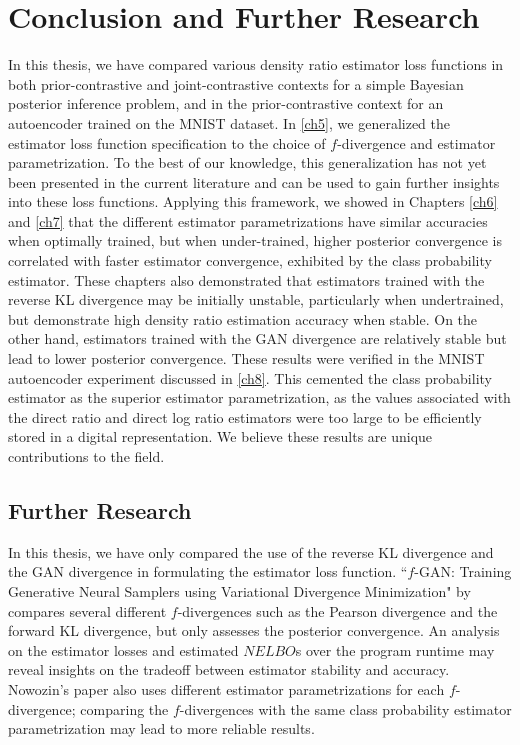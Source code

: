 \documentclass[honours,12pt, twoside]{unswthesis}
\numberwithin{equation}{section}
\theoremstyle{definition}
\begin{document}
\chapter{Conclusion and Further Research}\label{ch9}
In this thesis, we have compared various density ratio estimator loss functions in both prior-contrastive and joint-contrastive contexts for a simple Bayesian posterior inference problem, and in the prior-contrastive context for an autoencoder trained on the MNIST dataset. In \autoref{ch5}, we generalized the estimator loss function specification to the choice of $f$-divergence and estimator parametrization. To the best of our knowledge, this generalization has not yet been presented in the current literature and can be used to gain further insights into these loss functions. Applying this framework, we showed in Chapters \ref{ch6} and \ref{ch7} that the different estimator parametrizations have similar accuracies when optimally trained, but when under-trained, higher posterior convergence is correlated with faster estimator convergence, exhibited by the class probability estimator. These chapters also demonstrated that estimators trained with the reverse KL divergence may be initially unstable, particularly when undertrained, but demonstrate high density ratio estimation accuracy when stable. On the other hand, estimators trained with the GAN divergence are relatively stable but lead to lower posterior convergence. These results were verified in the MNIST autoencoder experiment discussed in \autoref{ch8}. This cemented the class probability estimator as the superior estimator parametrization, as the values associated with the direct ratio and direct log ratio estimators were too large to be efficiently stored in a digital representation. We believe these results are unique contributions to the field.
\section{Further Research}
In this thesis, we have only compared the use of the reverse KL divergence and the GAN divergence in formulating the estimator loss function. ``$f$-GAN: Training Generative Neural Samplers using Variational Divergence Minimization" by \citet{nowozin} compares several different $f$-divergences such as the Pearson divergence and the forward KL divergence, but only assesses the posterior convergence. An analysis on the estimator losses and estimated $NELBO$s over the program runtime may reveal insights on the tradeoff between estimator stability and accuracy. Nowozin's paper also uses different estimator parametrizations for each $f$-divergence; comparing the $f$-divergences with the same class probability estimator parametrization may lead to more reliable results.
\end{document}
